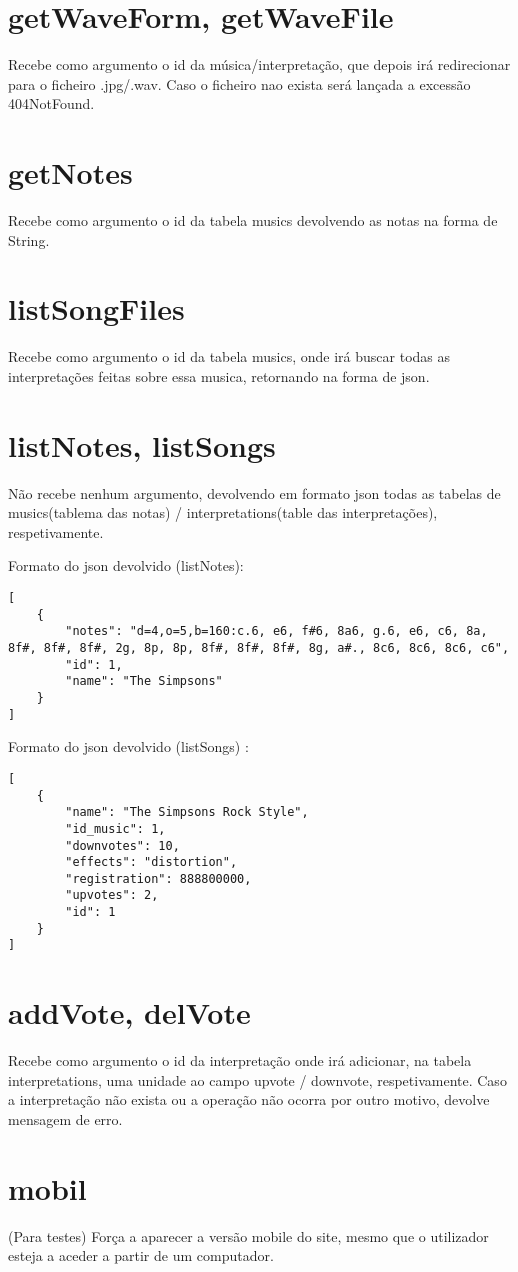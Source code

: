 \section{getWaveForm, getWaveFile}
Recebe como argumento o id da música/interpretação, que depois irá redirecionar para o ficheiro .jpg/.wav. Caso o ficheiro nao exista será lançada a excessão 404NotFound.

\section{getNotes}
Recebe como argumento o id da tabela musics devolvendo as notas na forma de String.

\section{listSongFiles}
Recebe como argumento o id da tabela musics, onde irá buscar todas as interpretações feitas sobre essa musica, retornando na forma de json.

\section{listNotes, listSongs}
Não recebe nenhum argumento, devolvendo em formato json todas as tabelas de musics(tablema das notas) / interpretations(table das interpretações), respetivamente.

Formato do json devolvido (listNotes):
\begin{lstlisting}
[
	{
		"notes": "d=4,o=5,b=160:c.6, e6, f#6, 8a6, g.6, e6, c6, 8a, 8f#, 8f#, 8f#, 2g, 8p, 8p, 8f#, 8f#, 8f#, 8g, a#., 8c6, 8c6, 8c6, c6",
		"id": 1,
		"name": "The Simpsons"
	}
]
\end{lstlisting}
Formato do json devolvido (listSongs) : 

\begin{lstlisting}
[
	{
		"name": "The Simpsons Rock Style",
		"id_music": 1,
		"downvotes": 10,
		"effects": "distortion",
		"registration": 888800000,
		"upvotes": 2,
		"id": 1
	}
]
\end{lstlisting}

\section{addVote, delVote}
Recebe como argumento o id da interpretação onde irá adicionar, na tabela interpretations, uma unidade ao campo upvote / downvote, respetivamente. Caso a interpretação não exista ou a operação não ocorra por outro motivo, devolve mensagem de erro.

\section{mobil}
(Para testes) Força a aparecer a versão mobile do site, mesmo que o utilizador esteja a aceder a partir de um computador.